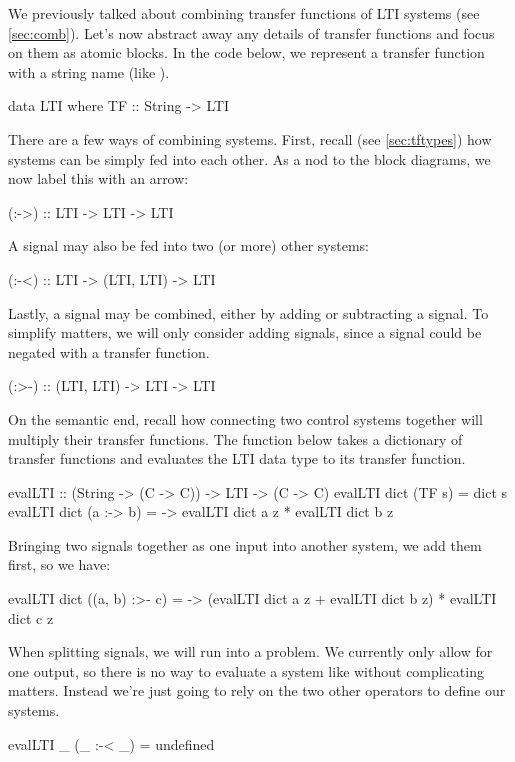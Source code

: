 We previously talked about combining transfer functions of LTI systems (see \ref{sec:comb}). Let's now abstract away any details of transfer functions and focus on them as atomic blocks.
In the code below, we represent a transfer function with a string name (like ).
\begin{code}
data LTI where
  TF :: String -> LTI
\end{code}
There are a few ways of combining systems. First, recall (see \ref{sec:tftypes}) how systems can be simply fed into each other. As a nod to the block diagrams, we now label this with an arrow:
\begin{code}
  (:->) :: LTI -> LTI -> LTI
\end{code}
A signal may also be fed into two (or more) other systems:
\begin{code}
  (:-<) :: LTI -> (LTI, LTI) -> LTI
\end{code}
Lastly, a signal may be combined, either by adding or subtracting a signal. To simplify matters, we will only consider adding signals, since a signal could be negated with a transfer function.
\begin{code}
  (:>-) :: (LTI, LTI) -> LTI -> LTI
\end{code}
On the semantic end, recall how connecting two control systems together will multiply their transfer functions. The function  below takes a dictionary of transfer functions and evaluates the LTI data type to its transfer function.
\begin{code}
evalLTI :: (String -> (C -> C)) -> LTI -> (C -> C)
evalLTI dict (TF s) = dict s
evalLTI dict (a :-> b) = \z -> evalLTI dict a z * evalLTI dict b z
\end{code}
Bringing two signals together as one input into another system, we add them first, so we have:
\begin{code}
evalLTI dict ((a, b) :>- c) = \z -> (evalLTI dict a z + evalLTI dict b z) * evalLTI dict c z
\end{code}
When splitting signals, we will run into a problem. We currently only allow for one output, so there is no way to evaluate a system like  without complicating matters. Instead we're just going to rely on the two other operators to define our systems.
\begin{code}
evalLTI _ (_ :-< _) = undefined
\end{code}


